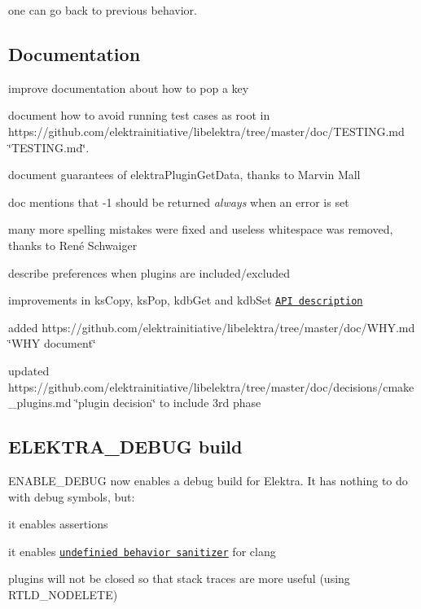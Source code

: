 one can go back to previous behavior.

\subsection*{Documentation}


\begin{DoxyItemize}
\item improve documentation about how to pop a key
\item document how to avoid running test cases as root in https\+://github.com/elektrainitiative/libelektra/tree/master/doc/\+T\+E\+S\+T\+I\+N\+G.\+md \char`\"{}\+T\+E\+S\+T\+I\+N\+G.\+md\char`\"{}.
\item document guarantees of {\ttfamily elektra\+Plugin\+Get\+Data}, thanks to Marvin Mall
\item doc mentions that -\/1 should be returned {\itshape always} when an error is set
\item many more spelling mistakes were fixed and useless whitespace was removed, thanks to René Schwaiger
\item describe preferences when plugins are included/excluded
\item improvements in {\ttfamily ks\+Copy}, {\ttfamily ks\+Pop}, {\ttfamily kdb\+Get} and {\ttfamily kdb\+Set} \href{https://doc.libelektra.org/api/0.8.17/html/}{\tt A\+PI description}
\item added https\+://github.com/elektrainitiative/libelektra/tree/master/doc/\+W\+H\+Y.\+md \char`\"{}\+W\+H\+Y document\char`\"{}
\item updated https\+://github.com/elektrainitiative/libelektra/tree/master/doc/decisions/cmake\+\_\+plugins.\+md \char`\"{}plugin decision\char`\"{} to include 3rd phase
\end{DoxyItemize}

\subsection*{E\+L\+E\+K\+T\+R\+A\+\_\+\+D\+E\+B\+UG build}

E\+N\+A\+B\+L\+E\+\_\+\+D\+E\+B\+UG now enables a debug build for Elektra. It has nothing to do with debug symbols, but\+:


\begin{DoxyItemize}
\item it enables assertions
\item it enables \href{http://clang.llvm.org/docs/UndefinedBehaviorSanitizer.html}{\tt undefinied behavior sanitizer} for clang
\item plugins will not be closed so that stack traces are more useful (using {\ttfamily R\+T\+L\+D\+\_\+\+N\+O\+D\+E\+L\+E\+TE})
\end{DoxyItemize}

